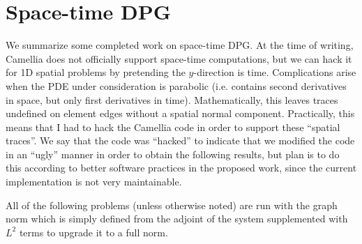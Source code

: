 \documentclass[Proposal.tex]{subfiles}
\begin{document}
\chapter{Space-time DPG}
\label{sec:spacetime}
We summarize some completed work on space-time DPG. At the time of writing, Camellia does not officially support space-time computations, but we can hack it for 1D spatial problems by pretending the $y$-direction is time.
Complications arise when the PDE under consideration is parabolic (i.e. contains second derivatives in space, but only first derivatives in time). 
Mathematically, this leaves traces undefined on element edges without a spatial normal component. 
Practically, this means that I had to hack the Camellia code in order to support these ``spatial traces''.
We say that the code was ``hacked'' to indicate that we modified the code in an ``ugly'' manner in order to obtain the following results, 
but plan is to do this according to better software practices in the proposed work, since the current implementation is not very maintainable.

All of the following problems (unless otherwise noted) are run with the graph norm which is
simply defined from the adjoint of the system supplemented with $L^2$ terms to upgrade it to a full norm.

\end{document}
